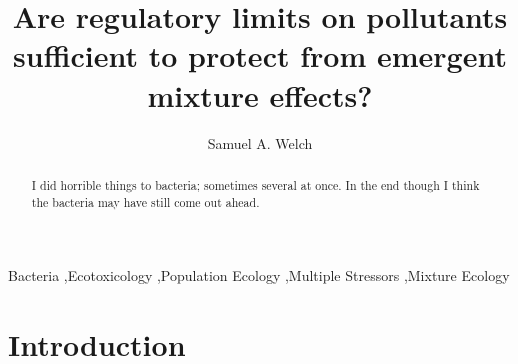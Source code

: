 \documentclass[review,12pt]{elsarticle}
\begin{document}
\begin{frontmatter}


\title{Are regulatory limits on pollutants sufficient to protect from emergent mixture effects?}




\author{Samuel A. Welch}

\address{Silwood Park, Imperial College London, United Kingdom}

\begin{abstract}
I did horrible things to bacteria; sometimes several at once. In the end though I think the bacteria may have still come out ahead.
\end{abstract}

\begin{keyword}
Bacteria \sep Ecotoxicology \sep Population Ecology \sep Multiple Stressors \sep Mixture Ecology


\end{keyword}

\end{frontmatter}

\linenumbers

\section{Introduction}
\label{S:1}
\end{document}
